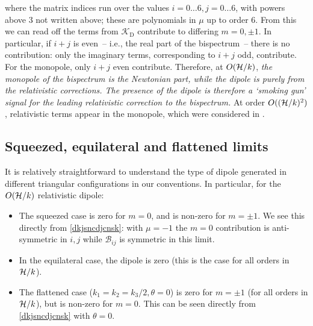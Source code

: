 \begin{widetext}
where the matrix indices run over the values $i=0\ldots6, j=0\ldots6$, with powers above 3 not written above; these are polynomials in $\mu$ up to order 6. From this we can read off the terms from $\mathcal{K}_\text{D}$ contribute to differing $m=0,\pm1$. In particular, if $i+j$ is even~-- i.e., the real part of the bispectrum~--  there is no contribution: only the imaginary terms, corresponding to $i+j$ odd, contribute. For the monopole, only $i+j$ even contribute. Therefore, at $O(\mathcal{H}/k)$, \emph{the monopole of the bispectrum is the Newtonian part, while the dipole is purely from the relativistic corrections.  The presence of the dipole is therefore a `smoking gun' signal for the leading relativistic correction to the bispectrum.} At order $O((\mathcal{H}/k)^{2})$, relativistic terms appear in the monopole, which were considered in \citet{Umeh:2016nuh,Jolicoeur:2017nyt,Jolicoeur:2017eyi,Jolicoeur:2018blf}.\\

\end{widetext}

\subsection*{Squeezed, equilateral and flattened limits}

It is relatively straightforward to understand the type of dipole generated in different triangular configurations in our conventions. In particular, for the $O(\mathcal{H}/k)$ relativistic dipole:
\begin{itemize}
\item The squeezed case is zero for $m=0$, and is non-zero for $m=\pm1$. We see this directly from \eqref{dkjsncdjcnsk}: with $\mu=-1$ the $m=0$ contribution is anti-symmetric in $i,j$ while $\mathcal{B}_{ij}$ is symmetric in this limit.
\item In the equilateral case, the dipole is zero (this is the case for all orders in $\mathcal{H}/k$).
\item The flattened case ($k_1=k_2=k_3/2,\theta=0$) is zero for $m=\pm1$ (for all orders in $\mathcal{H}/k$), but is non-zero for $m=0$. This can be seen directly from \eqref{dkjsncdjcnsk} with $\theta=0$.
\end{itemize}
 
